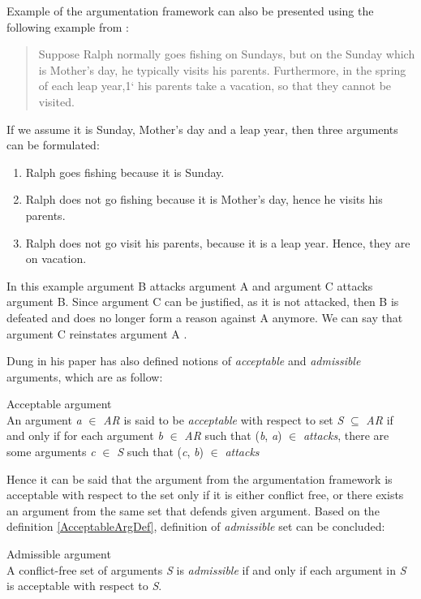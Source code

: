 Example of the argumentation framework can also be presented using the following example from \citet{konolige1988defeasible}:
\begin{quote}
Suppose Ralph normally goes fishing on Sundays, but on the Sunday which is
Mother’s day, he typically visits his parents. Furthermore, in the spring of each
leap year,1` his parents take a vacation, so that they cannot be visited.
\end{quote}
If we assume it is Sunday, Mother's day and a leap year, then three arguments can be formulated:
\begin{enumerate}[label=\Alph*]
	\item{Ralph goes fishing because it is Sunday.}
	\item{Ralph does not go fishing because it is Mother's day, hence he visits his parents.}
	\item{Ralph does not go visit his parents, because it is a leap year. Hence, they are on vacation.}
\end{enumerate}
In this example argument B attacks argument A and argument C attacks argument B. Since argument C can be justified, as it is not attacked, then B is defeated and does no longer form a reason against A anymore. We can say that argument C reinstates argument A \citep{caminada2004sake}.


Dung in his paper \citep{dung1995} has also defined notions of \textit{acceptable} and \textit{admissible} arguments, which are as follow:

\begin{definition}{Acceptable argument}
\label{AcceptableArgDef}\\
An argument \textit{a} $\in$ \textit{AR} is said to be \textit{acceptable} with respect to set \textit{S} $\subseteq$ \textit{AR} if and only if for each argument \textit{b} $\in$ \textit{AR} such that (\textit{b}, \textit{a}) $\in$ \textit{attacks}, there are some arguments \textit{c} $\in$ \textit{S} such that (\textit{c}, \textit{b}) $\in$ \textit{attacks}
\end{definition}

Hence it can be said that the argument from the argumentation framework is acceptable with respect to the set only if it is either conflict free, or there exists an argument from the same set that defends given argument. Based on the definition \ref{AcceptableArgDef}, definition of \textit{admissible} set can be concluded:

\begin{definition}{Admissible argument}
\label{AdmissibleArgDef}\\
A conflict-free set of arguments \textit{S} is \textit{admissible} if and only if each argument in \textit{S} is acceptable with respect to \textit{S}.
\end{definition}

